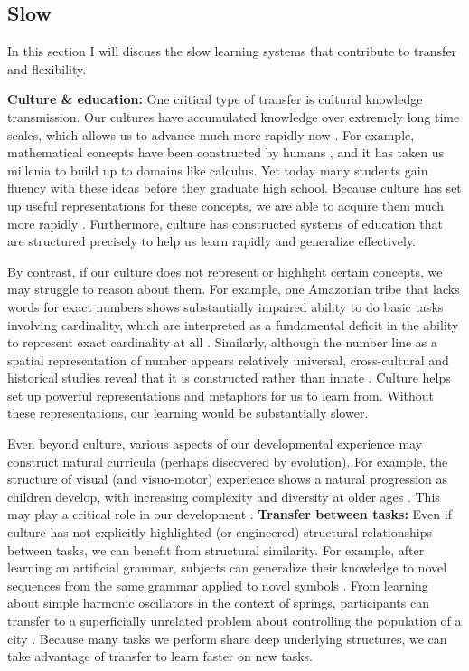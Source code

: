 \subsection{Slow}
In this section I will discuss the slow learning systems that contribute to transfer and flexibility. \par
\textbf{Culture \& education:} One critical type of transfer is cultural knowledge transmission. Our cultures have accumulated knowledge over extremely long time scales, which allows us to advance much more rapidly now \citep{Tomasello1993, Bengio2012}. For example, mathematical concepts have been constructed by humans \citep{Hersh1997, MacLane1986}, and it has taken us millenia to build up to domains like calculus. Yet today many students gain fluency with these ideas before they graduate high school. Because culture has set up useful representations for these concepts, we are able to acquire them much more rapidly \citep[e.g.][]{McClelland2016}. Furthermore, culture has constructed systems of education that are structured precisely to help us learn rapidly and generalize effectively. \par 
By contrast, if our culture does not represent or highlight certain concepts, we may struggle to reason about them. For example, one Amazonian tribe that lacks words for exact numbers shows substantially impaired ability to do basic tasks involving cardinality, which are interpreted as a fundamental deficit in the ability to represent exact cardinality at all \citep{Gordon2004}. Similarly, although the number line as a spatial representation of number appears relatively universal, cross-cultural and historical studies reveal that it is constructed rather than innate \citep{Nunez2011}. Culture helps set up powerful representations and metaphors for us to learn from. Without these representations, our learning would be substantially slower. \par 
Even beyond culture, various aspects of our developmental experience may construct natural curricula (perhaps discovered by evolution). For example, the structure of visual (and visuo-motor) experience shows a natural progression as children develop, with increasing complexity and diversity at older ages \citep{Fausey2016}. This may play a critical role in our development \citep{Smith2017}. 
\textbf{Transfer between tasks:} Even if culture has not explicitly highlighted (or engineered) structural relationships between tasks, we can benefit from structural similarity. For example, after learning an artificial grammar, subjects can generalize their knowledge to novel sequences from the same grammar applied to novel symbols \citep[e.g.][]{Tunney2001}. From learning about simple harmonic oscillators in the context of springs, participants can transfer to a superficially unrelated problem about controlling the population of a city \citep[e.g.][]{Day2011}. Because many tasks we perform share deep underlying structures, we can take advantage of transfer to learn faster on new tasks. \par 
